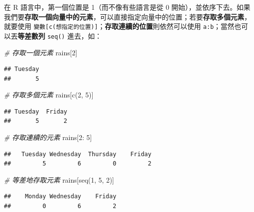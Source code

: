 \documentclass[
]{book}
\newenvironment{Shaded}{\begin{snugshade}}{\end{snugshade}}
\newcommand{\CommentTok}[1]{\textcolor[rgb]{0.56,0.35,0.01}{\textit{#1}}}
\newcommand{\DecValTok}[1]{\textcolor[rgb]{0.00,0.00,0.81}{#1}}
\newcommand{\FunctionTok}[1]{\textcolor[rgb]{0.00,0.00,0.00}{#1}}
\newcommand{\NormalTok}[1]{#1}
\newcommand{\SpecialCharTok}[1]{\textcolor[rgb]{0.00,0.00,0.00}{#1}}
\theoremstyle{definition}
\theoremstyle{remark}
\begin{document}
在 R 語言中，第一個位置是 1（而不像有些語言是從 0 開始），並依序下去。如果我們要\textbf{存取一個向量中的元素}，可以直接指定向量中的位置；若要\textbf{存取多個元素}，就要使用 \texttt{變數{[}c(想指定的位置){]}}；\textbf{存取連續的位置}則依然可以使用 \texttt{a:b}；當然也可以丟\textbf{等差數列} \texttt{seq()} 進去，如：

\begin{Shaded}
\begin{Highlighting}[]
\CommentTok{\# 存取一個元素}
\NormalTok{rains[}\DecValTok{2}\NormalTok{]}
\end{Highlighting}
\end{Shaded}

\begin{verbatim}
## Tuesday 
##       5
\end{verbatim}

\begin{Shaded}
\begin{Highlighting}[]
\CommentTok{\# 存取多個元素}
\NormalTok{rains[}\FunctionTok{c}\NormalTok{(}\DecValTok{2}\NormalTok{, }\DecValTok{5}\NormalTok{)]}
\end{Highlighting}
\end{Shaded}

\begin{verbatim}
## Tuesday  Friday 
##       5       2
\end{verbatim}

\begin{Shaded}
\begin{Highlighting}[]
\CommentTok{\# 存取連續的元素}
\NormalTok{rains[}\DecValTok{2}\SpecialCharTok{:} \DecValTok{5}\NormalTok{]}
\end{Highlighting}
\end{Shaded}

\begin{verbatim}
##   Tuesday Wednesday  Thursday    Friday 
##         5         6         0         2
\end{verbatim}

\begin{Shaded}
\begin{Highlighting}[]
\CommentTok{\# 等差地存取元素}
\NormalTok{rains[}\FunctionTok{seq}\NormalTok{(}\DecValTok{1}\NormalTok{, }\DecValTok{5}\NormalTok{, }\DecValTok{2}\NormalTok{)]}
\end{Highlighting}
\end{Shaded}

\begin{verbatim}
##    Monday Wednesday    Friday 
##         0         6         2
\end{verbatim}
\end{document}
